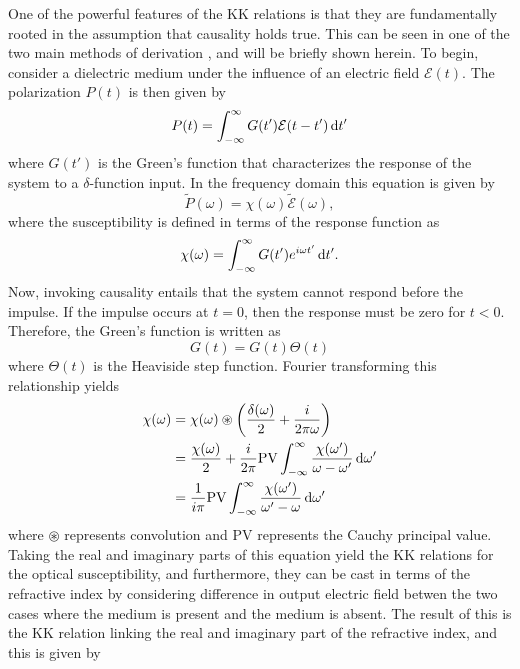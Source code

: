 One of the powerful features of the KK relations is that they are fundamentally rooted in the assumption that causality holds true.  This can be seen in one of the two main methods of derivation \cite{hutchingsKramersKronigRelationsNonlinear1992, jacksonClassicalElectrodynamics1999, arfkenMathematicalMethodsPhysicists2013}, and will be briefly shown herein.   To begin, consider a dielectric medium under the influence of an electric field $\mathcal{E}(t)$.  The polarization $P(t)$ is then given by
\begin{equation}
	P(t)=\int_{-\infty}^{\infty}G(t')\mathcal{E}(t-t') \mathop{}\!\mathrm{d} t'
\end{equation} 
where $G(t')$ is the Green's function that characterizes the response of the system to a $\delta$-function input.  In the frequency domain this equation is given by
\begin{equation}
	\tilde{P}(\omega)=\chi(\omega)\tilde{\mathcal{E}}(\omega),
\end{equation}
where the susceptibility is defined in terms of the response function as
\begin{equation}
	\chi(\omega)=\int_{-\infty}^{\infty}G(t')e^{i\omega t'}\mathop{}\!\mathrm{d} t'.
\end{equation}
Now, invoking causality entails that the system cannot respond before the impulse.  If the impulse occurs at $t=0$, then the response must be zero for $t<0$.  Therefore, the Green's function is written as
\begin{equation}
	G(t)=G(t)\Theta(t)
\end{equation}
where $\Theta(t)$ is the Heaviside step function.  Fourier transforming this relationship yields
\begin{equation}
	\label{eqn:KK_chi}
	\begin{aligned}
		\chi(\omega) &= \chi(\omega) \circledast \bigg(\frac{\delta(\omega)}{2} + \frac{i}{2\pi\omega}\bigg)\\
		& = \frac{\chi(\omega)}{2} + \frac{i}{2\pi} \mathrm{PV} \int_{-\infty}^{\infty}\frac{\chi(\omega')}{\omega - \omega'}\mathop{}\!\mathrm{d}\omega'\\
		& = \frac{1}{i\pi} \mathrm{PV} \int_{-\infty}^{\infty}\frac{\chi(\omega')}{\omega' - \omega} \mathop{}\!\mathrm{d} \omega'
	\end{aligned}
\end{equation}
where $\circledast$ represents convolution and  $\mathrm{PV}$ represents the Cauchy principal value.  Taking the real and imaginary parts of this equation yield the KK relations for the optical susceptibility, and furthermore, they can be cast in terms of the refractive index by considering difference in output electric field betwen the two cases where the medium is present and the medium is absent.  The result of this is the KK relation linking the real and imaginary part of the refractive index, and this is given by

